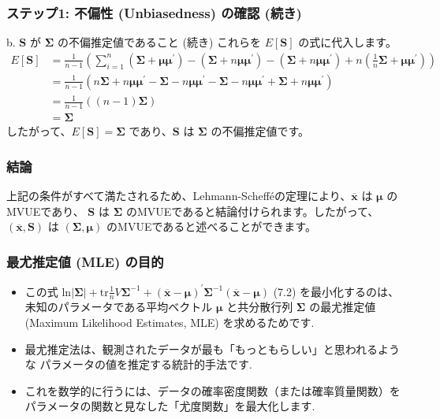 \documentclass{beamer}
\begin{document}
\begin{frame}
\frametitle{ステップ1: 不偏性 (Unbiasedness) の確認 (続き)}
\begin{block}{b. $\bm{S}$ が $\bm{\Sigma}$ の不偏推定値であること (続き)}
これらを $E[\bm{S}]$ の式に代入します。
\begin{align*}
E[\bm{S}] &= \frac{1}{n-1}\left(\sum_{i=1}^{n}(\bm{\Sigma}+\bm{\mu}\bm{\mu}^{\prime})-(\bm{\Sigma}+n\bm{\mu}\bm{\mu}^{\prime})-(\bm{\Sigma}+n\bm{\mu}\bm{\mu}^{\prime})+n(\frac{1}{n}\bm{\Sigma}+\bm{\mu}\bm{\mu}^{\prime})\right) \\
&= \frac{1}{n-1}\left(n\bm{\Sigma}+n\bm{\mu}\bm{\mu}^{\prime}-\bm{\Sigma}-n\bm{\mu}\bm{\mu}^{\prime}-\bm{\Sigma}-n\bm{\mu}\bm{\mu}^{\prime}+\bm{\Sigma}+n\bm{\mu}\bm{\mu}^{\prime}\right) \\
&= \frac{1}{n-1}((n-1)\bm{\Sigma}) \\
&= \bm{\Sigma}
\end{align*}
したがって、$E[\bm{S}]=\bm{\Sigma}$ であり、$\bm{S}$ は $\bm{\Sigma}$ の不偏推定値です。
\end{block}
\end{frame}


\begin{frame}
\frametitle{結論}
\begin{block}{}
上記の条件がすべて満たされるため、Lehmann-Schefféの定理により、$\overline{\bm{x}}$ は $\bm{\mu}$ のMVUEであり、 $\bm{S}$ は $\bm{\Sigma}$ のMVUEであると結論付けられます。したがって、$(\overline{\bm{x}},\bm{S})$ は $(\bm{\Sigma},\bm{\mu})$ のMVUEであると述べることができます。
\end{block}
\end{frame}

\begin{frame}
\frametitle{最尤推定値 (MLE) の目的}
\begin{itemize}
    \item この式 $\text{ln}|\bm{\Sigma}|+\text{tr}\frac{1}{n}V\bm{\Sigma}^{-1}+(\overline{\bm{x}}-\bm{\mu})^{\prime}\bm{\Sigma}^{-1}(\overline{\bm{x}}-\bm{\mu})$ (7.2) を最小化するのは、未知のパラメータである平均ベクトル $\bm{\mu}$ と共分散行列 $\bm{\Sigma}$ の最尤推定値 (Maximum Likelihood Estimates, MLE) を求めるためです.
    \item 最尤推定法は、観測されたデータが最も「もっともらしい」と思われるような
    パラメータの値を推定する統計的手法です.
    \item これを数学的に行うには、データの確率密度関数（または確率質量関数）を
    パラメータの関数と見なした「尤度関数」を最大化します.
\end{itemize}
\end{frame}
\end{document}
